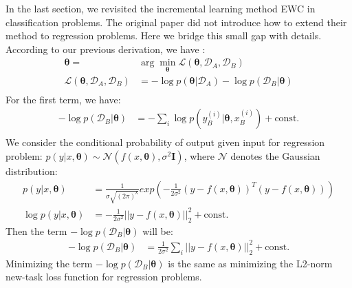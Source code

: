\documentclass{article}
\begin{document}
In the last section, we revisited the incremental learning method EWC in classification problems.
The original paper did not introduce how to extend their method to regression problems.
Here we bridge this small gap with details.
According to our previous derivation, we have :
\begin{equation}
\begin{split}
    \boldsymbol{\theta} = & \arg \min_{\boldsymbol{\theta}} \mathcal L(\boldsymbol{\theta}, \mathcal D_A, \mathcal D_B) \\
    \mathcal L(\boldsymbol{\theta}, \mathcal D_A, \mathcal D_B)  &= - \log p(\boldsymbol{\theta}|\mathcal D_A) - \log p(\mathcal D_B | \boldsymbol{\theta}) \\
\end{split}
\end{equation}
For the first term, we have:
\begin{equation}
\begin{split}
    - \log p(\mathcal D_B | \boldsymbol{\theta}) &=
    - \sum_i \log p(y_B^{(i)}| \boldsymbol{\theta}, x_B^{(i)})
    + \text{const.} \\
\end{split}
\end{equation}
We consider the conditional probability of output given input for regression problem:
$p(y|x, \boldsymbol{\theta}) \sim \mathcal N(f(x, \boldsymbol{\theta}), \sigma^2\boldsymbol{I})$,
where $\mathcal N$ denotes the Gaussian distribution:
\begin{equation}
\begin{split}
p(y|x,\boldsymbol{\theta}) &= \frac{1}{\sigma\sqrt{(2\pi)^k}}
exp(-\frac{1}{2\sigma^2}(y - f(x, \boldsymbol{\theta}))^T(y - f(x, \boldsymbol{\theta})))\\
\log p(y|x,\boldsymbol{\theta}) &= -\frac{1}{2\sigma^2} ||y - f(x, \boldsymbol{\theta})||_2^2 + \text{const.}
\label{eq:multinomial_likelihood_reg}
\end{split}
\end{equation}
Then the term $- \log p(\mathcal D_B | \boldsymbol{\theta})$ will be:
\begin{equation}
\begin{split}
- \log p(\mathcal D_B | \boldsymbol{\theta}) &= 
\frac{1}{2\sigma^2}  \sum_i ||y - f(x, \boldsymbol{\theta})||_2^2 + \text{const.}
\end{split}
\end{equation}
Minimizing the term $- \log p(\mathcal D_B | \boldsymbol{\theta})$
is the same as minimizing the L2-norm new-task loss function for regression problems.
\end{document}
